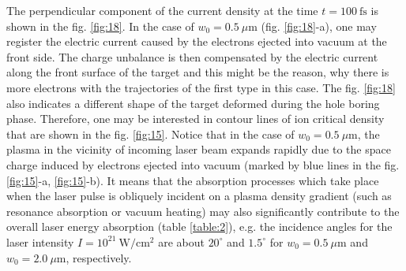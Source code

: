 The perpendicular component of the current density at the time $ t = 100 \ \mathrm{fs} $ is shown in the fig. \ref{fig:18}. In the case of $ w_0 = 0.5 \ \mu\mathrm{m} $ (fig. \ref{fig:18}-a), one may register the electric current caused by the electrons ejected into vacuum at the front side. The charge unbalance is then compensated by the electric current along the front surface of the target and this might be the reason, why there is more electrons with the trajectories of the first type in this case. The fig. \ref{fig:18} also indicates a different shape of the target deformed during the hole boring phase. Therefore, one may be interested in contour lines of ion critical density that are shown in the fig. \ref{fig:15}. Notice that in the case of $ w_0 = 0.5 \ \mu\mathrm{m} $, the plasma in the vicinity of incoming laser beam expands rapidly due to the space charge induced by electrons ejected into vacuum (marked by blue lines in the fig. \ref{fig:15}-a, \ref{fig:15}-b). It means that the absorption processes which take place when the laser pulse is obliquely incident on a plasma density gradient (such as resonance absorption or vacuum heating) may also significantly contribute to the overall laser energy absorption (table \ref{table:2}), e.g. the incidence angles for the laser intensity $ I = 10^{21} \ \mathrm{W/cm^2} $ are about $ 20^{\circ} $ and $ 1.5^{\circ} $ for $ w_0 = 0.5 \ \mu\mathrm{m} $ and $ w_0 = 2.0 \ \mu\mathrm{m} $, respectively.

